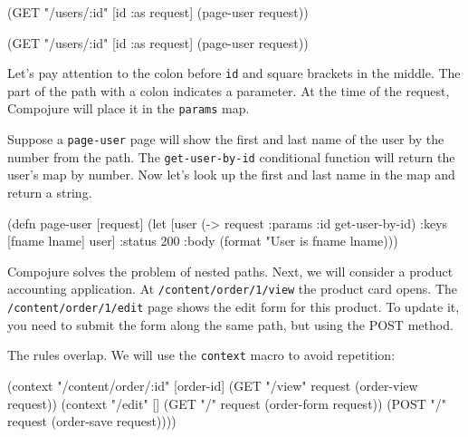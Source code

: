 \begin{clojure}
(GET "/users/:id" [id :as request]
    (page-user request))
\end{clojure}

\else

\begin{clojure}
(GET "/users/:id" [id :as request] (page-user request))
\end{clojure}

\fi

Let's pay attention to the colon before \verb|id| and square brackets in the middle.
The part of the path with a colon indicates a parameter. At the time of the request, Compojure will place it in the \verb|params| map.

Suppose a \verb|page-user| page will show the first and last name of the user by the number from the path. The \verb|get-user-by-id| conditional function will return the user's map by number. Now let's look up the first and last name in the map and return a string.

\ifx\DEVICETYPE\MOBILE

\begin{clojure}
(defn page-user [request]
   (let [user (-> request
                  :params
                  :id
                  get-user-by-id)
         {:keys [fname lname]} user]
     {:status 200
      :body (format "User is %
                    fname lname)}))
\end{clojure}

\else


\fi

Compojure solves the problem of nested paths. Next, we will consider a product accounting application. At \verb|/content/order/1/view| the product card opens. The \verb|/content/order/1/edit| page shows the edit form for this product. To update it, you need to submit the form along the same path, but using the POST method.

The rules overlap. We will use the \verb|context| macro to avoid repetition:


\ifx\DEVICETYPE\MOBILE

\begin{clojure}
(context "/content/order/:id" [order-id]
  (GET  "/view" request
        (order-view request))
  (context "/edit" []
    (GET  "/" request
          (order-form request))
    (POST "/" request
          (order-save request))))
\end{clojure}

